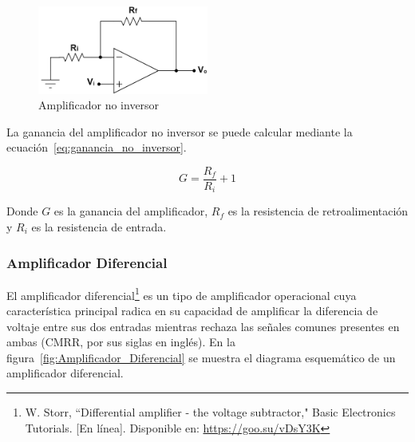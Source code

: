             \begin{figure}[H]
                \centering
                \includegraphics[width=0.5\textwidth]{img/Desarrollo/Amplificador_No_Inversor.png}
                \caption[Amplificador no inversor]{Amplificador no inversor\footnotemark}
                \label{fig:Amplificador_No_Inversor}
            \end{figure}

            La ganancia del amplificador no inversor se puede calcular mediante la ecuación~\ref{eq:ganancia_no_inversor}.

            \begin{equation}
                \label{eq:ganancia_no_inversor}
                G = \frac{R_f}{R_i} + 1
            \end{equation}

            Donde $G$ es la ganancia del amplificador, $R_f$ es la resistencia de retroalimentación y $R_i$ es la resistencia de entrada.

        \subsubsection{Amplificador Diferencial}
            El amplificador diferencial\footnote{W. Storr, ``Differential amplifier - the voltage subtractor," Basic Electronics Tutorials. [En línea]. Disponible en: \url{https://goo.su/vDsY3K}} es un tipo de amplificador operacional cuya característica principal radica en su capacidad de amplificar la diferencia de voltaje entre sus dos entradas mientras rechaza las señales comunes presentes en ambas (CMRR, por sus siglas en inglés). En la figura~\ref{fig:Amplificador_Diferencial} se muestra el diagrama esquemático de un amplificador diferencial.

